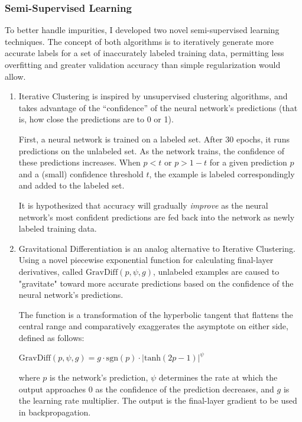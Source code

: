 \documentclass[12pt]{article}
\begin{document}
\subsubsection{Semi-Supervised Learning}

To better handle impurities, I developed two novel semi-supervised learning techniques. The concept of both algorithms is to iteratively generate more accurate labels for a set of inaccurately labeled training data, permitting less overfitting and greater validation accuracy than simple regularization would allow.

\begin{enumerate}
    \item Iterative Clustering is inspired by unsupervised clustering algorithms, and takes advantage of the ``confidence'' of the neural network's predictions (that is, how close the predictions are to 0 or 1).
    
    First, a neural network is trained on a labeled set. After 30 epochs, it runs predictions on the unlabeled set. As the network trains, the confidence of these predictions increases. When $p < t$ or $p > 1 - t$ for a given prediction $p$ and a (small) confidence threshold $t$, the example is labeled correspondingly and added to the labeled set.

    It is hypothesized that accuracy will gradually \textit{improve} as the neural network's most confident predictions are fed back into the network as newly labeled training data.

    \item Gravitational Differentiation is an analog alternative to Iterative Clustering. Using a novel piecewise exponential function for calculating final-layer derivatives, called $\mathrm{GravDiff}(p, \psi, g)$, unlabeled examples are caused to "gravitate" toward more accurate predictions based on the confidence of the neural network's predictions.

    The function is a transformation of the hyperbolic tangent that flattens the central range and comparatively exaggerates the asymptote on either side, defined as follows:
    \begin{center}
        $\mathrm{GravDiff}(p, \psi, g) = g \cdot \mathrm{sgn}(p) \cdot \lvert \mathrm{tanh}(2p - 1) \rvert ^ \psi$
    \end{center}
    where $p$ is the network's prediction, $\psi$ determines the rate at which the output approaches 0 as the confidence of the prediction decreases, and $g$ is the learning rate multiplier. The output is the final-layer gradient to be used in backpropagation.
\end{enumerate}
\end{document}
